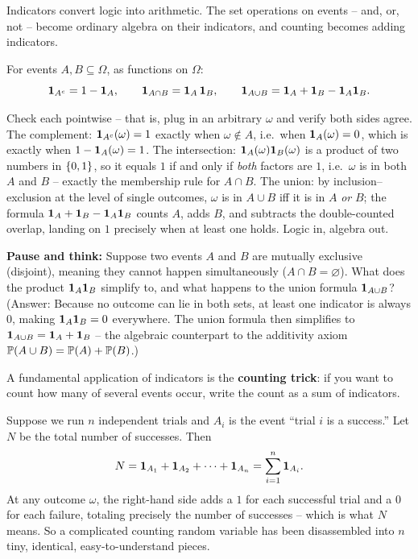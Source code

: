 Indicators convert logic into arithmetic. The set operations on events -- and, or, not -- become ordinary
algebra on their indicators, and counting becomes adding indicators.

\begin{proposition}
\label{ch06:prop-indicator-dict}
For events $A, B \subseteq \Omega$, as functions on $\Omega$:
\[
  \ind_{A^c} = 1 - \ind_A, \qquad
  \ind_{A \cap B} = \ind_A \,\ind_B, \qquad
  \ind_{A \cup B} = \ind_A + \ind_B - \ind_A \ind_B.
\]
\end{proposition}

\begin{whybox}
Check each pointwise -- that is, plug in an arbitrary $\omega$ and verify both sides
agree. The complement: $\ind_{A^c}(\omega) = 1$ exactly when $\omega \notin A$, i.e.\
when $\ind_A(\omega) = 0$, which is exactly when $1 - \ind_A(\omega) = 1$. The
intersection: $\ind_A(\omega)\ind_B(\omega)$ is a product of two numbers in
$\set{0,1}$, so it equals $1$ if and only if \emph{both} factors are $1$, i.e.\ $\omega$
is in both $A$ and $B$ -- exactly the membership rule for $A \cap B$. The union: by
inclusion--exclusion at the level of single outcomes, $\omega$ is in $A \cup B$ iff it
is in $A$ \emph{or} $B$; the formula $\ind_A + \ind_B - \ind_A\ind_B$ counts $A$, adds
$B$, and subtracts the double-counted overlap, landing on $1$ precisely when at least
one holds. Logic in, algebra out.
\end{whybox}

\begin{walkbox}
\textbf{Pause and think:} Suppose two events $A$ and $B$ are mutually exclusive (disjoint),
meaning they cannot happen simultaneously ($A \cap B = \varnothing$). What does the
product $\ind_A \ind_B$ simplify to, and what happens to the union formula $\ind_{A \cup B}$?
(Answer: Because no outcome can lie in both sets, at least one indicator is always $0$,
making $\ind_A \ind_B = 0$ everywhere. The union formula then simplifies to
$\ind_{A \cup B} = \ind_A + \ind_B$ -- the algebraic counterpart to the additivity axiom
$\P(A \cup B) = \P(A) + \P(B)$.)
\end{walkbox}

A fundamental application of indicators is the \textbf{counting trick}: if you
want to count how many of several events occur, write the count as a sum of indicators.

\begin{example}
\label{ch06:ex-counting-indicators}
Suppose we run $n$ independent trials and $A_i$ is the event ``trial $i$ is a
success.'' Let $N$ be the total number of successes. Then
\[
  N = \ind_{A_1} + \ind_{A_2} + \cdots + \ind_{A_n} = \sum_{i=1}^n \ind_{A_i}.
\]
At any outcome $\omega$, the right-hand side adds a $1$ for each successful trial and a
$0$ for each failure, totaling precisely the number of successes -- which is what $N$
means. So a complicated counting random variable has been disassembled into $n$ tiny,
identical, easy-to-understand pieces.
\end{example}

